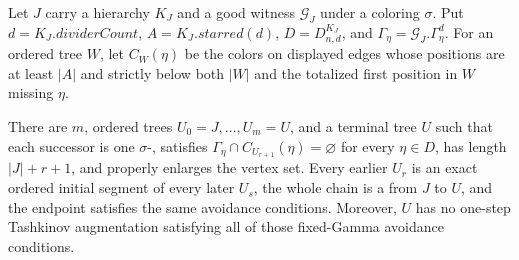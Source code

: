 \begin{helper}
Let $J$ carry a hierarchy $K_J$ and a good witness $\mathcal G_J$ under a
coloring $\sigma$.  Put $d=K_J.\mathit{dividerCount}$,
$A=K_J.\mathit{starred}(d)$, $D=D^{K_J}_{n,d}$, and
$\Gamma_\eta=\mathcal G_J.\Gamma^d_\eta$.  For an ordered tree $W$, let
$C_W(\eta)$ be the colors on displayed edges whose positions are at least
$|A|$ and strictly below both $|W|$ and the totalized first position in
$W$ missing $\eta$.

There are $m$, ordered trees $U_0=J,\ldots,U_m=U$, and a terminal tree
$U$ such that each successor is one
$\sigma$-, satisfies
$\Gamma_\eta\cap C_{U_{r+1}}(\eta)=\varnothing$ for every $\eta\in D$,
has length $|J|+r+1$, and properly enlarges the vertex set.  Every earlier
$U_r$ is an exact ordered initial segment of every later $U_s$, the whole
chain is a  from $J$ to $U$, and
the endpoint satisfies the same avoidance conditions.  Moreover, $U$ has
no one-step Tashkinov augmentation satisfying all of those fixed-Gamma
avoidance conditions.
\end{helper}
